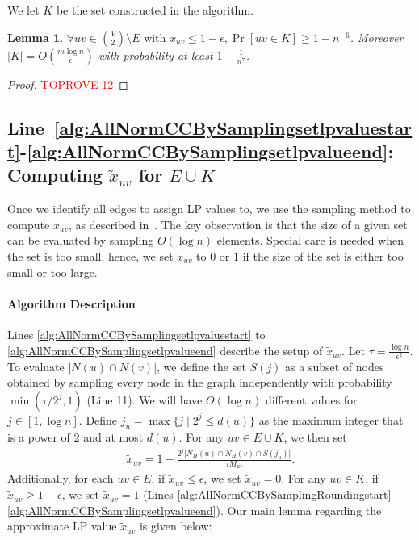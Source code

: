 \documentclass[11pt]{article}
\newtheorem{lemma}[theorem]{Lemma}
\begin{document}
\begin{CJK*}{UTF8}{gbsn}
We let $K$ be the set constructed in the algorithm. 
\begin{lemma}
    \label{lemma:samplingnegativesizebound}
$\forall uv \in {V \choose 2}\setminus E \text{ with } x_{uv} \leq 1 - \epsilon, \Pr[uv \in K] \geq 1 - n^{-6}$. 
Moreover \( |K| = O\left(\frac{m \log n}{\epsilon}\right) \) with probability at least \( 1 - \frac{1}{n^7} \).
\end{lemma}

\begin{proof}\textcolor{red}{TOPROVE 12}\end{proof}



\subsection{Line~\ref{alg:AllNormCCBySamplingsetlpvaluestart}-\ref{alg:AllNormCCBySamplingsetlpvalueend}: Computing $\tilde{x}_{uv}$ for $E \cup K$}

Once we identify all edges to assign LP values to, we use the sampling method to compute $x_{uv}$, as described in~\cite{davies2023fast}. The key observation is that the size of a given set can be evaluated by sampling $O(\log n)$ elements. Special care is needed when the set is too small; hence, we set $\tilde{x}_{uv}$ to $0$ or $1$ if the size of the set is either too small or too large.

\paragraph{Algorithm Description}
Lines \ref{alg:AllNormCCBySamplingsetlpvaluestart} to \ref{alg:AllNormCCBySamplingsetlpvalueend} describe the setup of $\tilde{x}_{uv}$. Let $\tau = \frac{\log n}{\epsilon^2}$. To evaluate $|N(u) \cap N(v)|$, we define the set $S(j)$ as a subset of nodes obtained by sampling every node in the graph independently with probability $\min(\tau / 2^j, 1)$ (Line 11). We will have $O(\log n)$ different values for $j \in [1, \log n]$. Define $j_u = \max\{j \mid 2^j \leq d(u)\}$ as the maximum integer that is a power of 2 and at most $d(u)$. For any $uv \in E \cup K$, we then set 
\begin{align*}
    \tilde{x}_{uv} = 1 - \frac{ 2^j |N_H(u) \cap N_H(v) \cap S(j_u)|}{ \tau M_{uv}}.
\end{align*}
Additionally, for each $uv \in E$, if $\tilde{x}_{uv} \leq \epsilon$, we set $\tilde{x}_{uv} = 0$. For any $uv \in K$, if $\tilde{x}_{uv} \geq 1 - \epsilon$, we set $\tilde{x}_{uv} = 1$ (Lines \ref{alg:AllNormCCBySamplingRoundingstart}-\ref{alg:AllNormCCBySamplingsetlpvalueend}). Our main lemma regarding the approximate LP value $\tilde{x}_{uv}$ is given below:


\end{CJK*}
\end{document}

